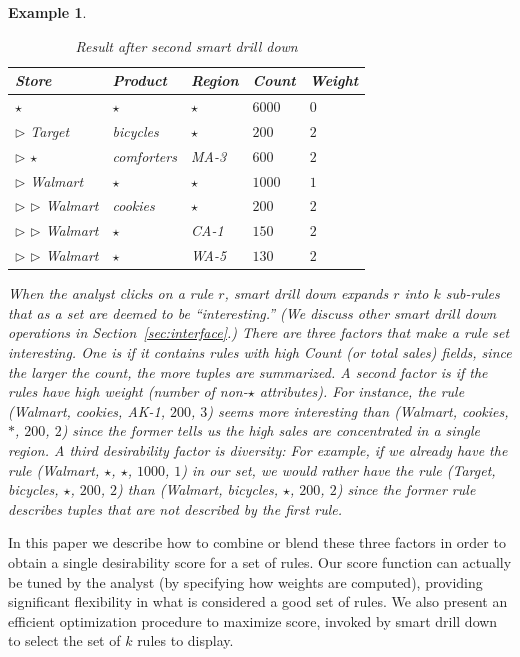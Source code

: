 \documentclass[10pt,journal,compsoc]{IEEEtran}
\newtheorem{example}[definition]{Example}
\begin{document}
\begin{example}
\begin{table}
\vspace{-10pt}
\scriptsize
\centering
\begin{tabular}{| l | l | l | l | l |}
\hline Store & Product & Region & Count & Weight \\
\hline
$\star$ & $\star$ & $\star$ & $6000$ & $0$ \\  \cline{1-5}
$\triangleright$ Target & bicycles & $\star$ & $200$ & $2$ \\ \cline{1-5}
$\triangleright$ $\star$ & comforters & MA-3 & $600$ & $2$ \\ \cline{1-5}
$\triangleright$ Walmart & $\star$ & $\star$ & $1000$ & $1$ \\ \cline{2-5}
$\triangleright$ $\triangleright$ Walmart & cookies & $\star$ & $200$ & $2$ \\ \cline{2-5}
$\triangleright$ $\triangleright$ Walmart & $\star$ & CA-1 & $150$ & $2$ \\ \cline{2-5}
$\triangleright$ $\triangleright$ Walmart & $\star$ & WA-5 & $130$ & $2$ \\ \hline
\end{tabular}
\caption{Result after second smart drill down} \label{table:introexample2}
\vspace{-10pt}
\end{table}

When the analyst clicks on a rule $r$, smart drill down
expands $r$ into $k$ sub-rules that as a set are deemed to be ``interesting.''
(We discuss other smart drill down operations in Section~\ref{sec:interface}.)
There are three factors that make a rule set interesting.
One is if it contains rules with high Count (or total sales) fields,
since the larger the count, the more tuples are summarized.
A second factor is if the rules have high weight (number of non-$\star$ attributes).
For instance, the rule (Walmart, cookies, AK-1, $200$, $3$)
seems more interesting than (Walmart, cookies, $*$, $200$, $2$)
since the former tells us the high sales are concentrated in a single region.
A third desirability factor is diversity:
For example, if we already have the rule (Walmart, $\star$, $\star$, $1000$, $1$)
in our set, we would rather have the rule (Target, bicycles, $\star$, $200$, $2$)
than (Walmart, bicycles, $\star$, $200$, $2$) since the former rule
describes tuples that are not described by the first rule.
\end{example}

In this paper we describe how to combine or blend these three factors
in order to obtain a single desirability score for a set of rules.
Our score function can actually be tuned by the analyst
(by specifying how weights are computed),
providing significant flexibility in what is considered a good set of rules.
We also present an efficient optimization procedure to maximize score, invoked
by smart drill down to select the set of $k$ rules to display.
\end{document}
